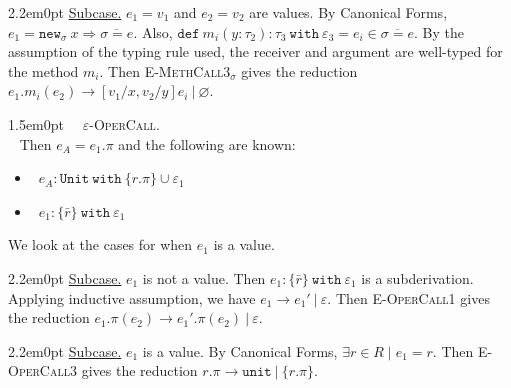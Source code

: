 \documentclass{llncs}
\newcommand{\keywadj}[1]{\mathtt{#1}}
\newcommand{\keyw}[1]{\keywadj{#1}~}
\newcommand{\proofcase}[2]{
	\begin{adjustwidth}{1.5em}{0pt}
		\fbox{Case.}~~#1. \\ ~#2
	\end{adjustwidth}
}
\newcommand{\subcase}[1] {
	\begin{adjustwidth}{2.2em}{0pt}
		\underline{Subcase.} #1
	\end{adjustwidth}
}
\begin{document}
{{			\subcase{ $e_1 = v_1$ and $e_2 = v_2$ are values. By Canonical Forms, $e_1 = \keywadj{new}_{\sigma}~x \Rightarrow \overline{\sigma = e}$. Also, $\keyw{def} m_i(y: \tau_2) : \tau_3~\keyw{with} \varepsilon_3 = e_i \in \overline{ \sigma = e }$. By the assumption of the typing rule used, the receiver and argument are well-typed for the method $m_i$. Then \textsc{E-MethCall3$_{\sigma}$} gives the reduction $e_1.m_i(e_2) \longrightarrow [v_1/x, v_2/y]e_i~|~\varnothing$.\\}

	}
	
	\proofcase{\textsc{$\varepsilon$-OperCall}} {
Then $e_A = e_1.\pi$ and the following are known:
\begin{itemize}
	\item~$e_A : \keyw{Unit~with} \{ r.\pi \} \cup \varepsilon_1$
	\item~$e_1 : \{ \bar r \}~\keyw{with} \varepsilon_1$
\end{itemize}
We look at the cases for when $e_1$ is a value.
	
		\subcase { $e_1$ is not a value. Then $e_1 : \{ \bar r \}~\keyw{with} \varepsilon_1$ is a subderivation. Applying inductive assumption, we have $e_1 \longrightarrow e_1'~|~\varepsilon$. Then \textsc{E-OperCall1} gives the reduction $e_1.\pi(e_2) \longrightarrow e_1'.\pi(e_2)~|~\varepsilon$.
		}
		
		\subcase { $e_1$ is a value. By Canonical Forms, $\exists r \in R \mid e_1 = r$. Then \textsc{E-OperCall3} gives the reduction $r.\pi \longrightarrow \keywadj{unit}~|~\{ r.\pi \}$.\\}
		
	}
}
\end{document}
